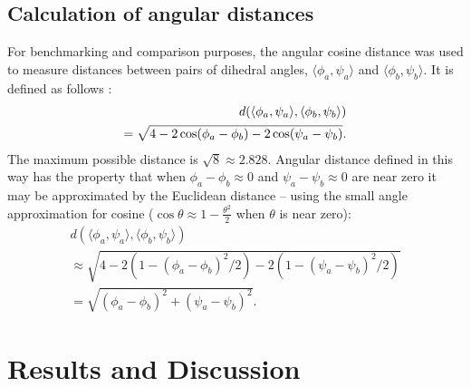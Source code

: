\documentclass[nogrid]{MBE}%
\begin{document}
\subsection{Calculation of angular distances}\label{sec:angulardistance}
For benchmarking and comparison purposes, the angular cosine distance was used to measure distances between pairs of dihedral angles, $\langle\phi_{a},\psi_{a}\rangle$ and $\langle\phi_{b},\psi_{b}\rangle$. It is defined as follows \citep{downs2002circular}:
\begin{align}
d(\langle\phi_{a},\psi_{a}\rangle,\langle\phi_{b},\psi_{b}\rangle)\notag\\
=\sqrt{4-2\cos(\phi_{a}-\phi_{b})-2\cos(\psi_{a}-\psi_{b})}.
\label{eq:angular_distance}
\end{align}
The maximum possible distance is $\sqrt{8} \approx 2.828$. Angular distance defined in this way has the property that when $\phi_{a}-\phi_{b}\approx 0$ and $\psi_{a}-\psi_{b}\approx 0$ are near zero it may be approximated by the Euclidean distance -- using the small angle approximation for cosine ($\cos\theta\approx1-\frac{\theta^{2}}{2}$  when $\theta$ is near zero):
\begin{align*}
d(\langle\phi_{a},\psi_{a}\rangle,\langle\phi_{b},\psi_{b}\rangle)\\ \approx\sqrt{4-2(1-(\phi_{a}-\phi_{b})^{2}/2)-2(1-(\psi_{a}-\psi_{b})^{2}/2)}\\
=\sqrt{(\phi_{a}-\phi_{b})^{2}+(\psi_{a}-\psi_{b})^{2}}.
\end{align*}

\section{Results and Discussion}
\end{document}
